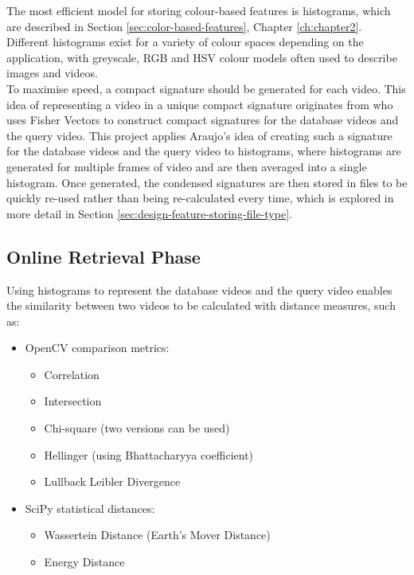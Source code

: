 The most efficient model for storing colour-based features is histograms, which are described in Section \ref{sec:color-based-features}, Chapter \ref{ch:chapter2}. Different histograms exist for a variety of colour spaces depending on the application, with greyscale, RGB and HSV colour models often used to describe images and videos.\\ 

To maximise speed, a compact signature should be generated for each video. This idea of representing a video in a unique compact signature originates from \cite{araujo2017i2v} who uses Fisher Vectors to construct compact signatures for the database videos and the query video. This project applies Araujo's idea of creating such a signature for the database videos and the query video to histograms, where histograms are generated for multiple frames of video and are then averaged into a single histogram. Once generated, the condensed signatures are then stored in files to be quickly re-used rather than being re-calculated every time, which is explored in more detail in Section \ref{sec:design-feature-storing-file-type}. 

\subsection{Online Retrieval Phase}
\label{sec:design-online-retrieval}

Using histograms to represent the database videos and the query video enables the similarity between two videos to be calculated with distance measures, such as:
\begin{itemize}
    \item OpenCV comparison metrics:
    \begin{itemize}
        \item Correlation
        \item Intersection
        \item Chi-square (two versions can be used)
        \item Hellinger (using Bhattacharyya coefficient)
        \item Lullback Leibler Divergence
    \end{itemize}
    \item SciPy statistical distances:
    \begin{itemize}
        \item Wassertein Distance (Earth's Mover Distance)
        \item Energy Distance
    \end{itemize}
   
\end{itemize}

